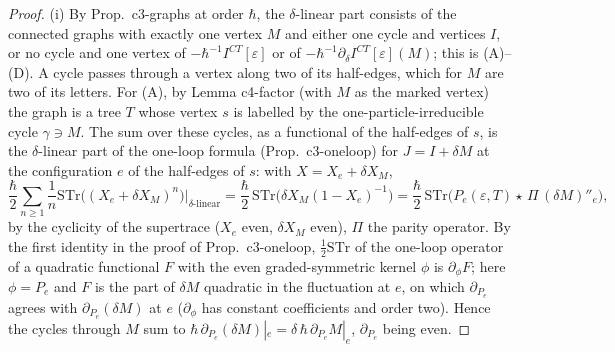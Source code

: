 \documentclass[11pt]{article}
\numberwithin{equation}{section}
\theoremstyle{plain}
\theoremstyle{definition}
\begin{document}
\begin{proof}
(i) By Prop.~c3-graphs at order $\hbar$, the $\delta$-linear part consists of the connected graphs with exactly one vertex $M$ and either one cycle and vertices $I$, or no cycle and one vertex of $-\hbar^{-1}I^{CT}[\varepsilon]$ or of $-\hbar^{-1}\partial_\delta I^{CT}[\varepsilon](M)$; this is (A)--(D). A cycle passes through a vertex along two of its half-edges, which for $M$ are two of its letters. For (A), by Lemma c4-factor (with $M$ as the marked vertex) the graph is a tree $T$ whose vertex $s$ is labelled by the one-particle-irreducible cycle $\gamma\ni M$. The sum over these cycles, as a functional of the half-edges of $s$, is the $\delta$-linear part of the one-loop formula (Prop.~c3-oneloop) for $J=I+\delta M$ at the configuration $e$ of the half-edges of $s$: with $X=X_e+\delta X_M$,
\[
\frac\hbar2\sum_{n\ge1}\frac1n\mathrm{STr}\big((X_e+\delta X_M)^n\big)\Big|_{\delta\text{-linear}}=\frac\hbar2\,\mathrm{STr}\big(\delta X_M(1-X_e)^{-1}\big)=\frac\hbar2\,\mathrm{STr}\big(P_e(\varepsilon,T)\star\,\Pi\,(\delta M)''_e\big),
\]
by the cyclicity of the supertrace ($X_e$ even, $\delta X_M$ even), $\Pi$ the parity operator. By the first identity in the proof of Prop.~c3-oneloop, $\tfrac12\mathrm{STr}$ of the one-loop operator of a quadratic functional $F$ with the even graded-symmetric kernel $\phi$ is $\partial_\phi F$; here $\phi=P_e$ and $F$ is the part of $\delta M$ quadratic in the fluctuation at $e$, on which $\partial_{P_e}$ agrees with $\partial_{P_e}(\delta M)$ at $e$ ($\partial_\phi$ has constant coefficients and order two). Hence the cycles through $M$ sum to $\hbar\,\partial_{P_e}(\delta M)|_e=\delta\,\hbar\,\partial_{P_e}M|_e$, $\partial_{P_e}$ being even.


\end{proof}
\end{document}
